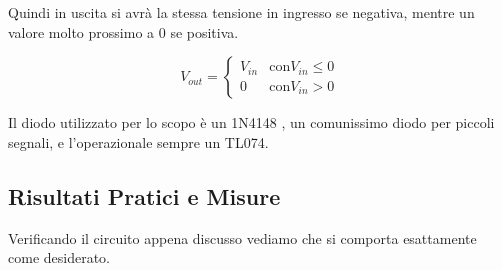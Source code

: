 
Quindi in uscita si avrà la stessa tensione in ingresso se negativa, mentre un valore molto
prossimo a $0$ se positiva.

\begin{equation}\label{clipper}
    V_{out} =
    \left\{
    \begin{array}{lr}
        V_{in} & \text{con} V_{in}\le0 \\
        0      & \text{con} V_{in}>0
    \end{array}
    \right.
\end{equation}

Il diodo utilizzato per lo scopo è un 1N4148 \cite{1n4148}, un comunissimo diodo per piccoli
segnali, e l'operazionale sempre un TL074.


\subsection*{Risultati Pratici e Misure}


Verificando il circuito appena discusso vediamo che si comporta esattamente come desiderato.



